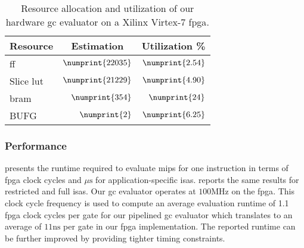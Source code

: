 \begin{table}
\centering
\caption{Resource allocation and utilization of our hardware \acrshort{gc} evaluator on a Xilinx Virtex-7 \acrshort{fpga}.}
\label{table:resource}
\begin{tabular}{l|r|r}
Resource    & \multicolumn{1}{c|}{Estimation} & \multicolumn{1}{c}{Utilization \%} \\ \hline \hline
\acrlong{ff} & $\numprint{22035}$ & $\numprint{2.54}$ \\ \hline
Slice \acrshort{lut} & $\numprint{21229}$ & $\numprint{4.90}$ \\ \hline
\acrshort{bram} & $\numprint{354}$ & $\numprint{24}$
\\ \hline
BUFG & $\numprint{2}$ & $\numprint{6.25}$
 \end{tabular}
\end{table}

\subsubsection{Performance}
 presents the runtime required to evaluate \gls{mips} for one instruction in terms of \acrshort{fpga} clock cycles and $\mu\textrm{s}$ for application-specific \acrshort{isa}s.
 reports the same results for restricted and full \acrshort{isa}s.
Our \acrshort{gc} evaluator operates at $100\textrm{MHz}$ on the \acrshort{fpga}.
This clock cycle frequency is used to compute an average evaluation runtime of 1.1 \acrshort{fpga} clock cycles per gate for our pipelined \acrshort{gc} evaluator which translates to an average of $11\textrm{ns}$ per gate in our \acrshort{fpga} implementation.
The reported runtime can be further improved by providing tighter timing constraints.

